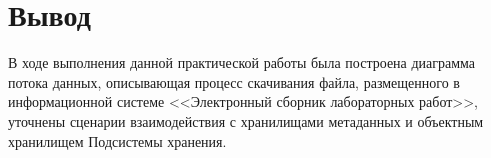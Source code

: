 \documentclass[a4paper,14pt]{extarticle}
\begin{document}
\section*{Вывод}
В ходе выполнения данной практической работы была построена диаграмма потока данных, описывающая процесс скачивания файла, размещенного в информационной системе <<Электронный сборник лабораторных работ>>, уточнены сценарии взаимодействия с хранилищами метаданных и объектным хранилищем Подсистемы хранения.
\end{document}
